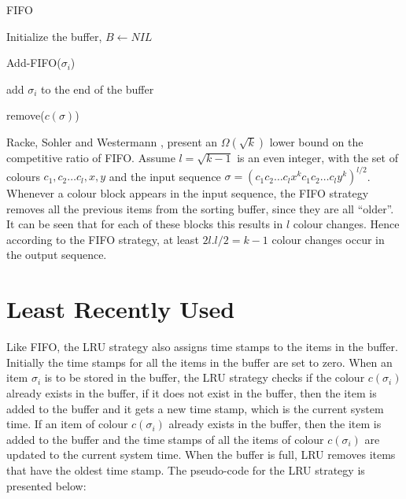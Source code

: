 \begin{algorithm}
\caption{FIFO}
\label{firstinfirstout}
Initialize the buffer, $B \gets NIL$ \;
\end{algorithm}

\begin{function*}
\caption{Add-FIFO($\sigma_i$)}
\label{addfifo}
add $\sigma_i$ to the end of the buffer \;
\end{function*}

\begin{function*}
\caption{remove(${c(\sigma)}$)}
\label{removefifo}
\end{function*}

Racke, Sohler and Westermann \cite{racke2002online}, present an
$\Omega(\sqrt{k})$ lower bound on the competitive ratio of FIFO. Assume $l =
\sqrt{k-1}$ is an even integer, with the set of colours $c_1, c_2 \ldots c_l,
x,y$  and the input sequence $\sigma = {(c_1c_2\ldots c_lx^kc_1c_2\ldots
c_ly^k)}^{l/2}$. Whenever a colour block appears in the input sequence, the FIFO
strategy removes all the previous items from the sorting buffer, since they are
all ``older''. It can be seen that for each of these blocks this results in $l$
colour changes. Hence according to the FIFO strategy, at least $2l.l/2 = k - 1$
colour changes occur in the output sequence.

\section{Least Recently Used} \label{lru}
Like FIFO, the LRU strategy also assigns time stamps to the items in the buffer.
Initially the time stamps for all the items in the buffer are set to zero. When
an item $\sigma_i$ is to be stored in the buffer, the LRU strategy checks if the
colour $c(\sigma_i)$ already exists in the buffer, if it does not exist in the
buffer, then the item is added to the buffer and it gets a new time stamp,
which is the current system time.
If an item of colour $c(\sigma_i)$ already exists in the buffer, then the item is
added to the buffer and the time stamps of all the items of colour $c(\sigma_i)$
are updated to the current system time. When the buffer is full, LRU removes
items that have the oldest time stamp.
The pseudo-code for the LRU strategy is presented below:


